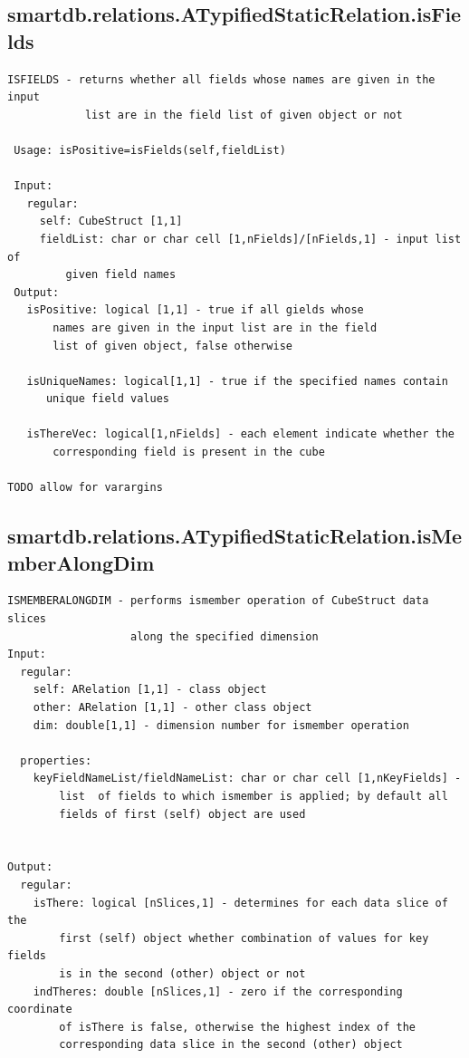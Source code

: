 \documentclass[letterpaper,10pt,english]{sphinxmanual}
\begin{document}
\subsection{smartdb.relations.ATypifiedStaticRelation.isFields}
\label{chap_functions:smartdb-relations-atypifiedstaticrelation-isfields}
\begin{Verbatim}[commandchars=\\\{\}]
 ISFIELDS - returns whether all fields whose names are given in the input
            list are in the field list of given object or not

 Usage: isPositive=isFields(self,fieldList)

 Input:
   regular:
     self: CubeStruct [1,1]
     fieldList: char or char cell [1,nFields]/[nFields,1] - input list of
         given field names
 Output:
   isPositive: logical [1,1] - true if all gields whose
       names are given in the input list are in the field
       list of given object, false otherwise

   isUniqueNames: logical[1,1] - true if the specified names contain
      unique field values

   isThereVec: logical[1,nFields] - each element indicate whether the
       corresponding field is present in the cube

TODO allow for varargins
\end{Verbatim}


\subsection{smartdb.relations.ATypifiedStaticRelation.isMemberAlongDim}
\label{chap_functions:smartdb-relations-atypifiedstaticrelation-ismemberalongdim}
\begin{Verbatim}[commandchars=\\\{\}]
ISMEMBERALONGDIM - performs ismember operation of CubeStruct data slices
                   along the specified dimension
Input:
  regular:
    self: ARelation [1,1] - class object
    other: ARelation [1,1] - other class object
    dim: double[1,1] - dimension number for ismember operation

  properties:
    keyFieldNameList/fieldNameList: char or char cell [1,nKeyFields] -
        list  of fields to which ismember is applied; by default all
        fields of first (self) object are used


Output:
  regular:
    isThere: logical [nSlices,1] - determines for each data slice of the
        first (self) object whether combination of values for key fields
        is in the second (other) object or not
    indTheres: double [nSlices,1] - zero if the corresponding coordinate
        of isThere is false, otherwise the highest index of the
        corresponding data slice in the second (other) object
\end{Verbatim}
\end{document}
